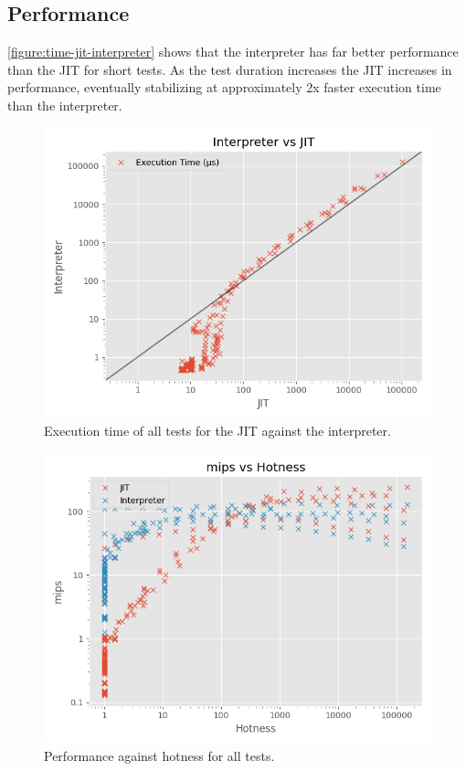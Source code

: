 \subsection{Performance}

\autoref{figure:time-jit-interpreter} shows that the interpreter has far better performance than the JIT for short tests. As the test duration increases the JIT increases in performance, eventually stabilizing at approximately 2x faster execution time than the interpreter.

\begin{figure}
    \centering
    \includegraphics{output/graphs/scatter/time.png}
    \caption{Execution time of all tests for the JIT against the interpreter.}
    \label{figure:time-jit-interpreter}
\end{figure}

\begin{figure}
    \centering
    \includegraphics{output/graphs/scatter/hotness.png}
    \caption{Performance against hotness for all tests.}
    \label{figure:hotness}
\end{figure}

